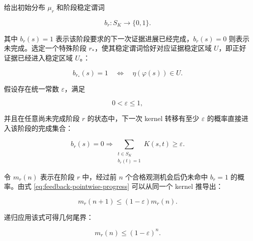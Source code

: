     给出初始分布 $\mu_r$ 和阶段稳定谓词

    \begin{equation}
    \boxed{
      b_r:S_K\longrightarrow\{0,1\}.}
      \label{eq:feedback-phase-stability-predicate}
    \end{equation}

    其中 $b_r(s)=1$ 表示该阶段要求的下一次证据进展已经完成，$b_r(s)=0$ 则表示未完成。选定一个特殊阶段 $r_\ast$，使其稳定谓词恰好对应证据稳定区域 $U$，即正好证据已经进入稳定区域 $U$。：

    \begin{equation}
      \boxed{
        b_{r_\ast}(s)=1
        \quad\Longleftrightarrow\quad
        \eta(\varphi(s))\in U.
      }
      \label{eq:feedback-hitting-phase-identification}
    \end{equation}

    假设存在统一常数 $\varepsilon$，满足

    \begin{equation}
      \boxed{
        0<\varepsilon\le 1,
      }
      \label{eq:feedback-positive-epsilon}
    \end{equation}

    并且在任意尚未完成阶段 $r$ 的状态中，下一次 kernel 转移有至少 $\varepsilon$ 的概率直接进入该阶段的完成集合：

    \begin{equation}
      \boxed{
        b_r(s)=0
        \Longrightarrow
        \sum_{\substack{t\in S_K\\b_r(t)=1}}
        K(s,t)
        \ge\varepsilon.
      }
      \label{eq:feedback-pointwise-progress}
    \end{equation}

    令 $m_r(n)$ 表示在阶段 $r$ 中，经过前 $n$ 个合格观测机会后仍未命中 $b_r=1$ 的概率。由式
    \eqref{eq:feedback-pointwise-progress} 可以从同一个 kernel 推导出：

    \begin{equation}
      \boxed{
        m_r(n+1)
        \le
        (1-\varepsilon)m_r(n).
      }
      \label{eq:feedback-miss-recurrence}
    \end{equation}

    递归应用该式可得几何尾界：

    \begin{equation}
      \boxed{
        m_r(n)
        \le
        (1-\varepsilon)^n.
      }
      \label{eq:feedback-geometric-tail}
    \end{equation}

